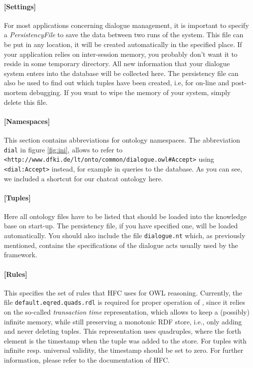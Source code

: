 \paragraph{[Settings]}

For most applications concerning dialogue management, it is important to
specify a \emph{PersistencyFile} to save the data between two runs of the
system. This file can be put in any location, it will be created automatically
in the specified place. If your application relies on inter-session memory,
you probably don't want it to reside in some temporary directory. All new
information that your dialogue system enters into the database will be
collected here. The persistency file can also be used to find out which tuples
have been created, i.e, for on-line and post-mortem debugging. If you want to
wipe the memory of your system, simply delete this file.

\paragraph{[Namespaces]}

This section contains abbreviations for ontology namespaces. The abbreviation
\texttt{dial} in figure \ref{fig:ini}, allows to refer to
\texttt{<http://www.dfki.de/lt/onto/common/dialogue.owl\#Accept>} using
\texttt{<dial:Accept>} instead, for example in queries to the database. As
you can see, we included a shortcut for our chatcat ontology here.

\paragraph{[Tuples]}

Here all ontology files have to be listed that should be loaded into the
knowledge base on start-up. The persistency file, if you have specified one,
will be loaded automatically. You should also include the file
\texttt{dialogue.nt} which, as previously mentioned, contains the
specifications of the dialogue acts usually used by the \vonda framework.

\paragraph{[Rules]}

This specifies the set of rules that HFC uses for OWL reasoning. Currently, the
file \texttt{default.eqred.quads.rdl} is required for proper operation of
\vonda, since it relies on the so-called \emph{transaction time}
representation, which allows to keep a (possibly) infinite memory, while still
preserving a monotonic RDF store, i.e., only adding and never deleting
tuples. This representation uses quadruples, where the forth element is the
timestamp when the tuple was added to the store. For tuples with infinite
resp. universal validity, the timestamp should be set to zero. For further
information, please refer to the documentation of HFC.

